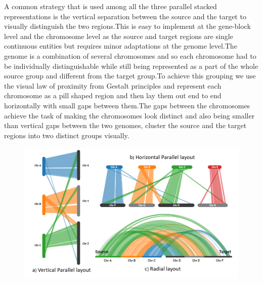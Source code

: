 A common strategy that is used among all the three parallel stacked representations is the vertical separation between the source and the target to visually distinguish the two regions.This is easy to implement at the gene-block level and the chromosome level as the source and target regions are single continuous entities but requires minor adaptations at the genome level.The genome is a combination of several chromosomes and so each chromosome had to be individually distinguishable while still being represented as a part of the whole source group and different from the target group.To achieve this grouping we use the visual law of proximity from Gestalt principles \cite{wertheimer1923untersuchungen} and represent each chromosome as a pill shaped region and then lay them out end to end horizontally with small gaps between them.The gaps between the chromosomes achieve the task of making the chromosomes look distinct and also being smaller than vertical gaps between the two genomes, cluster the source and the target regions into two distinct groups visually.

\begin{figure}
  \centering
  \includegraphics[width=.85\linewidth]{images/ch_4_layout.PNG}
  \label{fig:ch_4_layout}
\end{figure}



